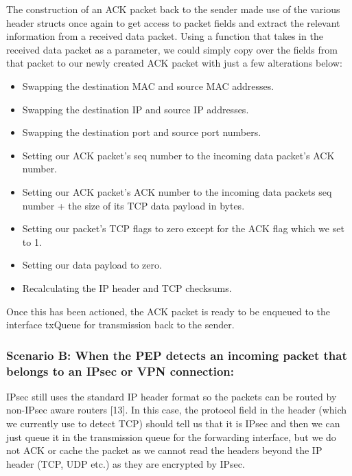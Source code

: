 \documentclass{uathesis}
\begin{document}
The construction of an ACK packet back to the sender made use of the various header structs once again to get access to packet fields and extract the relevant information from a received data packet. Using a function that takes in the received data packet as a parameter, we could simply copy over the fields from that packet to our newly created ACK packet with just a few alterations below:\\

\begin{itemize}
\item Swapping the destination MAC and source MAC addresses.
\item Swapping the destination IP  and source IP addresses.
\item Swapping the destination port  and source port numbers.
\item Setting our ACK packet's seq number to the incoming data packet's ACK number.
\item Setting our ACK packet's ACK number to the incoming data packets seq number + the size of its TCP data payload in bytes.
\item Setting our packet's TCP flags to zero except for the ACK flag which we set to 1.
\item Setting our data payload to zero.
\item Recalculating the IP header and TCP checksums. \\
\end{itemize} 

Once this has been actioned, the ACK packet is ready to be enqueued to the interface txQueue for transmission back to the sender. 


\subsubsection{Scenario B: When the PEP detects an incoming packet that belongs to an IPsec or VPN connection:}

IPsec still uses the standard IP header format so the packets can be routed by non-IPsec aware routers [13]. In this case, the protocol field in the header (which we currently use to detect TCP) should tell us that it is IPsec and then we can just queue it in the transmission queue for the forwarding interface, but we do not ACK or cache the packet as we cannot read the headers beyond the IP header (TCP, UDP etc.) as they are encrypted by IPsec. \\
\end{document}
